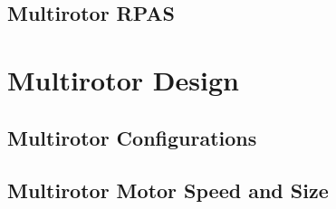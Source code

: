 \documentclass[10pt,letterpaper]{article}
\begin{document}
\subsection{Multirotor RPAS}\label{multirotor}


\clearpage
{}



\clearpage
\appendix
\section{Multirotor Design}\label{appendix:multirotor}
\subsection{Multirotor Configurations}


\subsection{Multirotor Motor Speed and Size}\label{appendix:droneengine}

\end{document}
